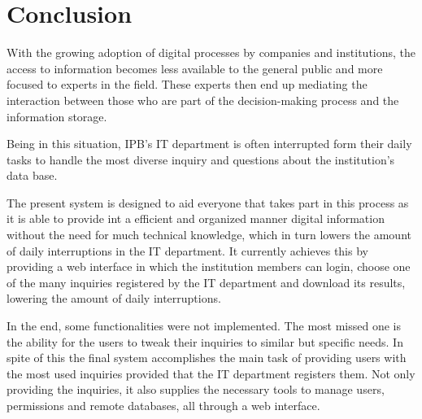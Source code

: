\chapter{Conclusion}

With the growing adoption of digital processes by companies and institutions, the access to information becomes less available to the general public and more focused to experts in the field. These experts then end up mediating the interaction between those who are part of the decision-making process and the information storage.

Being in this situation, \gls{IPB}'s \gls{IT} department is often interrupted form their daily tasks to handle the most diverse inquiry and questions about the institution's data base.

The present system is designed to aid everyone that takes part in this process as it is able to provide int a efficient and organized manner digital information without the need for much technical knowledge, which in turn lowers the amount of daily interruptions in the \gls{IT} department.
It currently achieves this by providing a web interface in which the institution members can login, choose one of the many inquiries registered by the \gls{IT} department and download its results, lowering the amount of daily interruptions.

In the end, some functionalities were not implemented. The most missed one is the ability for the users to tweak their inquiries to similar but specific needs.
In spite of this the final system accomplishes the main task of providing users with the most used inquiries provided that the \gls{IT} department registers them. Not only providing the inquiries, it also supplies the necessary tools to manage users, permissions and remote databases, all through a web interface.